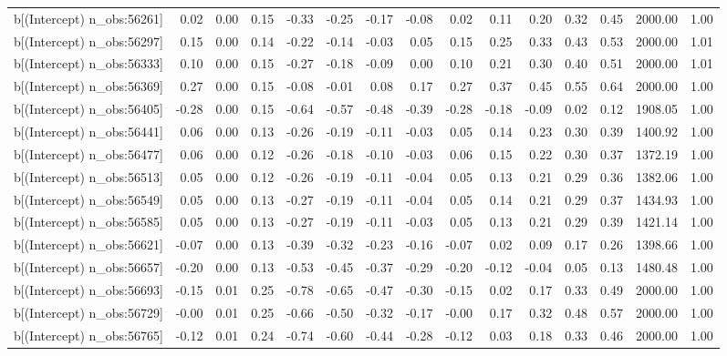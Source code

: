 \begin{table}[ht]
\begin{tabular}{rrrrrrrrrrrrrrr}
  b[(Intercept) n\_obs:56261] & 0.02 & 0.00 & 0.15 & -0.33 & -0.25 & -0.17 & -0.08 & 0.02 & 0.11 & 0.20 & 0.32 & 0.45 & 2000.00 & 1.00 \\ 
  b[(Intercept) n\_obs:56297] & 0.15 & 0.00 & 0.14 & -0.22 & -0.14 & -0.03 & 0.05 & 0.15 & 0.25 & 0.33 & 0.43 & 0.53 & 2000.00 & 1.01 \\ 
  b[(Intercept) n\_obs:56333] & 0.10 & 0.00 & 0.15 & -0.27 & -0.18 & -0.09 & 0.00 & 0.10 & 0.21 & 0.30 & 0.40 & 0.51 & 2000.00 & 1.01 \\ 
  b[(Intercept) n\_obs:56369] & 0.27 & 0.00 & 0.15 & -0.08 & -0.01 & 0.08 & 0.17 & 0.27 & 0.37 & 0.45 & 0.55 & 0.64 & 2000.00 & 1.00 \\ 
  b[(Intercept) n\_obs:56405] & -0.28 & 0.00 & 0.15 & -0.64 & -0.57 & -0.48 & -0.39 & -0.28 & -0.18 & -0.09 & 0.02 & 0.12 & 1908.05 & 1.00 \\ 
  b[(Intercept) n\_obs:56441] & 0.06 & 0.00 & 0.13 & -0.26 & -0.19 & -0.11 & -0.03 & 0.05 & 0.14 & 0.23 & 0.30 & 0.39 & 1400.92 & 1.00 \\ 
  b[(Intercept) n\_obs:56477] & 0.06 & 0.00 & 0.12 & -0.26 & -0.18 & -0.10 & -0.03 & 0.06 & 0.15 & 0.22 & 0.30 & 0.37 & 1372.19 & 1.00 \\ 
  b[(Intercept) n\_obs:56513] & 0.05 & 0.00 & 0.12 & -0.26 & -0.19 & -0.11 & -0.04 & 0.05 & 0.13 & 0.21 & 0.29 & 0.36 & 1382.06 & 1.00 \\ 
  b[(Intercept) n\_obs:56549] & 0.05 & 0.00 & 0.13 & -0.27 & -0.19 & -0.11 & -0.04 & 0.05 & 0.14 & 0.21 & 0.29 & 0.37 & 1434.93 & 1.00 \\ 
  b[(Intercept) n\_obs:56585] & 0.05 & 0.00 & 0.13 & -0.27 & -0.19 & -0.11 & -0.03 & 0.05 & 0.13 & 0.21 & 0.29 & 0.39 & 1421.14 & 1.00 \\ 
  b[(Intercept) n\_obs:56621] & -0.07 & 0.00 & 0.13 & -0.39 & -0.32 & -0.23 & -0.16 & -0.07 & 0.02 & 0.09 & 0.17 & 0.26 & 1398.66 & 1.00 \\ 
  b[(Intercept) n\_obs:56657] & -0.20 & 0.00 & 0.13 & -0.53 & -0.45 & -0.37 & -0.29 & -0.20 & -0.12 & -0.04 & 0.05 & 0.13 & 1480.48 & 1.00 \\ 
  b[(Intercept) n\_obs:56693] & -0.15 & 0.01 & 0.25 & -0.78 & -0.65 & -0.47 & -0.30 & -0.15 & 0.02 & 0.17 & 0.33 & 0.49 & 2000.00 & 1.00 \\ 
  b[(Intercept) n\_obs:56729] & -0.00 & 0.01 & 0.25 & -0.66 & -0.50 & -0.32 & -0.17 & -0.00 & 0.17 & 0.32 & 0.48 & 0.57 & 2000.00 & 1.00 \\ 
  b[(Intercept) n\_obs:56765] & -0.12 & 0.01 & 0.24 & -0.74 & -0.60 & -0.44 & -0.28 & -0.12 & 0.03 & 0.18 & 0.33 & 0.46 & 2000.00 & 1.00 \\ 

\end{tabular}
\end{table}
